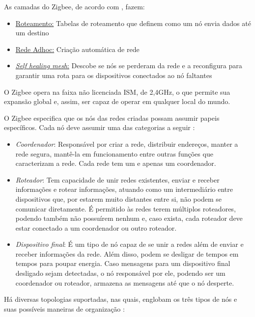 As camadas do Zigbee, de acordo com \cite{FALUDI2010}, fazem:

\begin{itemize} \parskip -4pt
	\item \underline{Roteamento:} Tabelas de roteamento que definem como um nó envia dados até um 
	destino
	\item \underline{Rede Adhoc:} Criação automática de rede
	\item \underline{\textit{Self healing mesh}:} Descobe se nós se perderam da rede e a 
	reconfigura para garantir uma rota para os dispositivos conectados ao nó faltantes
\end{itemize}

O Zigbee opera na faixa não licenciada ISM, de 2,4GHz, o que permite sua expansão global e, assim, ser capaz de operar em qualquer local do mundo.

O Zigbee especifica que os nós das redes criadas possam assumir papeis específicos. Cada nó deve 
assumir uma das categorias a seguir \cite{FALUDI2010}:

\begin{itemize} \parskip -4pt
	\item \textit{Coordenador}: Responsável por criar a rede, distribuir endereços, manter a rede segura, 
	mantê-la em funcionamento entre outras funções que caracterizam a rede. Cada rede tem um e 
	apenas um coordenador.
	\item \textit{Roteador}: Tem capacidade de unir redes existentes, enviar e receber informações e rotear 
	informações, atuando como um intermediário entre dispositivos que, por estarem muito distantes 
	entre si, não podem se comunicar diretamente. É permitido às redes terem múltiplos roteadores, 
	podendo também não possuírem nenhum e, caso exista, cada roteador deve estar conectado a um 
	coordenador ou outro roteador.
	\item \textit{Dispositivo final}: É um tipo de nó capaz de se unir a redes além de enviar e receber 
	informações da rede. Além disso, podem se desligar de tempos em tempos para poupar energia. 
	Caso mensagens para um dispositivo final desligado sejam detectadas, o nó responsável por ele, 
	podendo ser um coordenador ou roteador, armazena as mensagens até que o nó desperte.
\end{itemize}

Há diversas topologias suportadas, nas quais, englobam os três tipos de nós e suas possíveis 
maneiras de organização \cite{FALUDI2010}:

